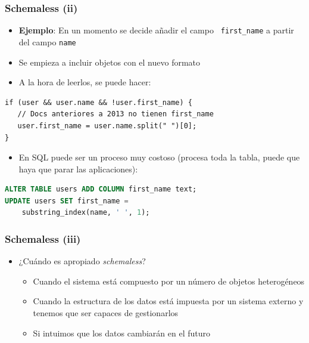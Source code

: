 \documentclass[14pt]{beamer}
\begin{document}

\begin{frame}[fragile]
  \frametitle{Schemaless (ii)}
\vspace*{-.7em}
\begin{itemize}
\item {\bf Ejemplo}: En un momento se decide añadir el campo {\tt
    first\_name} a partir del campo {\tt name}
\item Se empieza a incluir objetos con el nuevo formato
\item A la hora de leerlos, se puede hacer:
\end{itemize}
\begin{lstlisting}
if (user && user.name && !user.first_name) {
   // Docs anteriores a 2013 no tienen first_name
   user.first_name = user.name.split(" ")[0];
}
\end{lstlisting}
\begin{itemize}
\item En SQL puede ser un proceso muy costoso (procesa toda la tabla, puede
  que haya que parar las aplicaciones):
\end{itemize}
\begin{lstlisting}[language=SQL]
ALTER TABLE users ADD COLUMN first_name text;
UPDATE users SET first_name =
    substring_index(name, ' ', 1);
\end{lstlisting}
\end{frame}

\begin{frame}
  \frametitle{Schemaless (iii)}
  \begin{itemize}
\item ¿Cuándo es apropiado {\em schemaless}?
  \begin{itemize}
  \item Cuando el sistema está compuesto por un número de objetos
    heterogéneos
\item Cuando la estructura de los datos está impuesta por un sistema
  externo y tenemos que ser capaces de gestionarlos
\item Si intuimos que los datos cambiarán en el futuro
  \end{itemize}
\end{itemize}
\end{frame}
\end{document}
